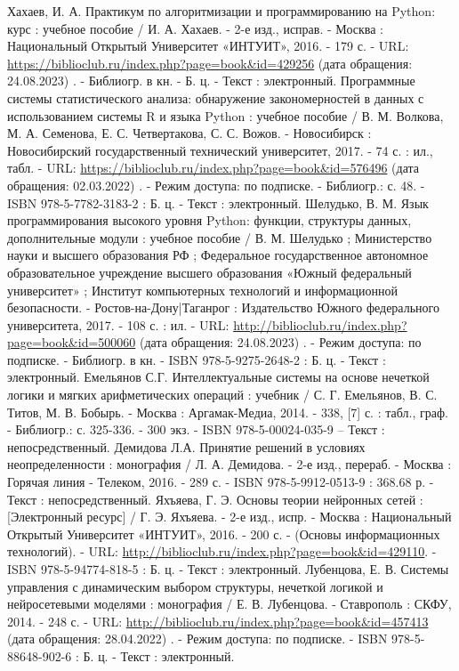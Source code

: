 \begin{thebibliography}{50}
     Хахаев, И. А.   Практикум по алгоритмизации и программированию на Python: курс : учебное пособие / И. А. Хахаев. - 2-е изд., исправ. - Москва : Национальный Открытый Университет «ИНТУИТ», 2016. - 179 с. - URL: \url{https://biblioclub.ru/index.php?page=book&id=429256} (дата обращения: 24.08.2023) . - Библиогр. в кн. - Б. ц. - Текст : электронный.
     Программные системы статистического анализа: обнаружение закономерностей в данных с использованием системы R и языка Python : учебное пособие / В. М. Волкова, М. А. Семенова, Е. С. Четвертакова, С. С. Вожов. - Новосибирск : Новосибирский государственный технический университет, 2017. - 74 с. : ил., табл. - URL: \url{https://biblioclub.ru/index.php?page=book&id=576496} (дата обращения: 02.03.2022) . - Режим доступа: по подписке. - Библиогр.: с. 48. - ISBN 978-5-7782-3183-2 : Б. ц. - Текст : электронный.
     Шелудько, В. М.  Язык программирования высокого уровня Python: функции, структуры данных, дополнительные модули : учебное пособие / В. М. Шелудько ; Министерство науки и высшего образования РФ ; Федеральное государственное автономное образовательное учреждение высшего образования «Южный федеральный университет» ; Институт компьютерных технологий и информационной безопасности. - Ростов-на-Дону|Таганрог : Издательство Южного федерального университета, 2017. - 108 с. : ил. - URL: \url{http://biblioclub.ru/index.php?page=book&id=500060} (дата обращения: 24.08.2023) . - Режим доступа: по подписке. - Библиогр. в кн. - ISBN 978-5-9275-2648-2 : Б. ц. - Текст : электронный.
     Емельянов С.Г.   Интеллектуальные системы на основе нечеткой логики и мягких арифметических операций : учебник / С. Г. Емельянов, В. С. Титов, М. В. Бобырь. - Москва : Аргамак-Медиа, 2014. - 338, [7] с. : табл., граф. - Библиогр.: с. 325-336. - 300 экз. - ISBN 978-5-00024-035-9 –  Текст : непосредственный.
     Демидова Л.А.  Принятие решений в условиях неопределенности : монография / Л. А. Демидова. - 2-е изд., перераб. - Москва : Горячая линия - Телеком, 2016. - 289 с. - ISBN 978-5-9912-0513-9 : 368.68 р. - Текст : непосредственный.
     Яхъяева, Г. Э.   Основы теории нейронных сетей : [Электронный ресурс] / Г. Э. Яхъяева. - 2-е изд., испр. - Москва : Национальный Открытый Университет «ИНТУИТ», 2016. - 200 с. - (Основы информационных технологий). - URL: \url{http://biblioclub.ru/index.php?page=book&id=429110}. - ISBN 978-5-94774-818-5 : Б. ц. - Текст : электронный.
     Лубенцова, Е. В.    Системы управления с динамическим выбором структуры, нечеткой логикой и нейросетевыми моделями : монография / Е. В. Лубенцова. - Ставрополь : СКФУ, 2014. - 248 с. - URL: \url{http://biblioclub.ru/index.php?page=book&id=457413} (дата обращения: 28.04.2022) . - Режим доступа: по подписке. - ISBN 978-5-88648-902-6 : Б. ц. - Текст : электронный.

\end{thebibliography}

